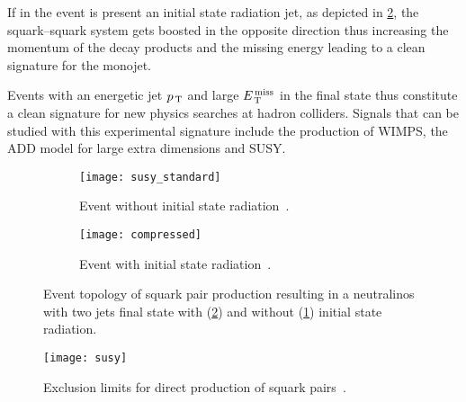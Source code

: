 If in the event is present an initial state radiation jet, as depicted in
\cref{fig:susy_compressed}, the squark--squark system gets boosted in the
opposite direction thus increasing the momentum of the decay products and the
missing energy leading to a clean signature for the monojet.

Events with an energetic jet $p_\mathrm{\, T}$ and large $E_\mathrm{\, T}^\mathrm{\, miss}$ in the final state thus
constitute a clean signature for new physics searches at hadron colliders.
Signals that can be studied with this experimental signature include the
production of WIMPS, the ADD model for large extra dimensions and SUSY\@.
\begin{figure}[!h]
  \centering
  \begin{subfigure}[t]{.48\linewidth}
    \texttt{[image: susy\_standard]}
    \caption{Event without initial state radiation~\cite{SUSYPub}.}
    \label{fig:susy_standard}
  \end{subfigure} \quad
  \begin{subfigure}[t]{.48\linewidth}
    \texttt{[image: compressed]}
    \caption{Event with initial state radiation~\cite{ExotPub}.}
    \label{fig:susy_compressed}
  \end{subfigure}
  \caption{Event topology of squark pair production resulting in a neutralinos
    with two jets final state with (\cref{fig:susy_compressed}) and without
    (\cref{fig:susy_standard}) initial state radiation.}
  \label{fig:motivation}
\end{figure}

\begin{figure}[!h]
  \centering
  \texttt{[image: susy]}
  \caption{Exclusion limits for direct production of squark
    pairs~\cite{SUSYPub}.}
  \label{fig:susy_exclusion}
\end{figure}
